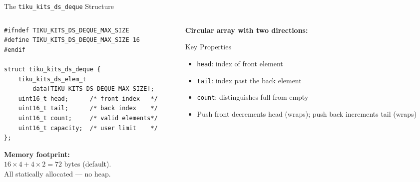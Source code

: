 \documentclass[aspectratio=169, 10pt]{beamer}
\begin{document}
\begin{frame}[fragile]{The \texttt{tiku\_kits\_ds\_deque} Structure}
\begin{columns}[T]
\begin{column}{0.48\textwidth}
\begin{lstlisting}[style=cstyle,
  title={ds/deque/tiku\_kits\_ds\_deque.h}]
#ifndef TIKU_KITS_DS_DEQUE_MAX_SIZE
#define TIKU_KITS_DS_DEQUE_MAX_SIZE 16
#endif

struct tiku_kits_ds_deque {
    tiku_kits_ds_elem_t
        data[TIKU_KITS_DS_DEQUE_MAX_SIZE];
    uint16_t head;      /* front index   */
    uint16_t tail;      /* back index    */
    uint16_t count;     /* valid elements*/
    uint16_t capacity;  /* user limit    */
};
\end{lstlisting}

\vspace{0.3em}
\textbf{Memory footprint:}\\
$16 \times 4 + 4 \times 2 = 72$ bytes (default).\\
All statically allocated --- no heap.
\end{column}

\begin{column}{0.48\textwidth}
\textbf{Circular array with two directions:}
\begin{center}
\end{center}

\vspace{0.5em}
\begin{block}{Key Properties}
\begin{itemize}
  \item \texttt{head}: index of front element
  \item \texttt{tail}: index past the back element
  \item \texttt{count}: distinguishes full from empty
  \item Push front decrements head (wraps); push back increments tail (wraps)
\end{itemize}
\end{block}
\end{column}
\end{columns}
\end{frame}
\end{document}
